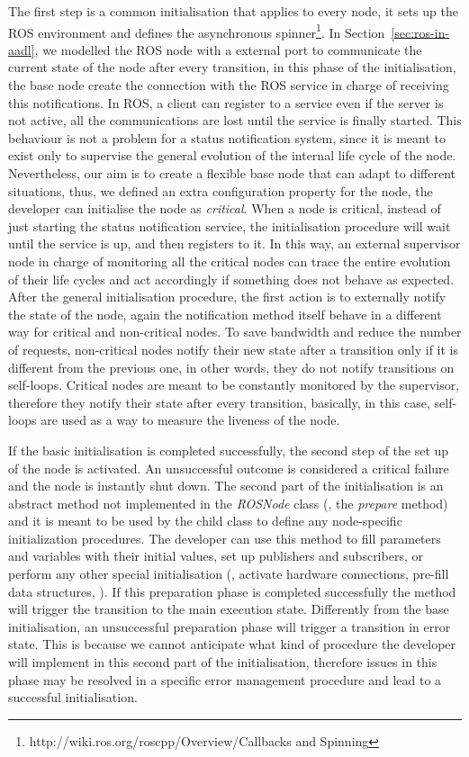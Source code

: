The first step is a common initialisation that applies to every node, it sets up the ROS environment and defines the asynchronous spinner\footnote{http://wiki.ros.org/roscpp/Overview/Callbacks and Spinning}. In Section~\ref{sec:ros-in-aadl}, we modelled the ROS node with a external port to communicate the current state of the node after every transition, in this phase of the initialisation, the base node create the connection with the ROS service in charge of receiving this notifications. In ROS, a client can register to a service even if the server is not active, all the communications are lost until the service is finally started. This behaviour is not a problem for a status notification system, since it is meant to exist only to supervise the general evolution of the internal life cycle of the node. Nevertheless, our aim is to create a flexible base node that can adapt to different situations, thus, we defined an extra configuration property for the node, the developer can initialise the node as \textit{critical}. When a node is critical, instead of just starting the status notification service, the initialisation procedure will wait until the service is up, and then registers to it. In this way, an external supervisor node in charge of monitoring all the critical nodes can trace the entire evolution of their life cycles and act accordingly if something does not behave as expected. After the general initialisation procedure, the first action is to externally notify the state of the node, again the notification method itself behave in a different way for critical and non-critical nodes. To save bandwidth and reduce the number of requests, non-critical nodes notify their new state after a transition only if it is different from the previous one, in other words, they do not notify transitions on self-loops. Critical nodes are meant to be constantly monitored by the supervisor, therefore they notify their state after every transition, basically, in this case, self-loops are used as a way to measure the liveness of the node.

If the basic initialisation is completed successfully, the second step of the set up of the node is activated. An unsuccessful outcome is considered a critical failure and the node is instantly shut down. The second part of the initialisation is an abstract method not implemented in the \textit{ROSNode} class (\ie, the \textit{prepare} method) and it is meant to be used by the child class to define any node-specific initialization procedures. The developer can use this method to fill parameters and variables with their initial values, set up publishers and subscribers, or perform any other special initialisation (\eg, activate hardware connections, pre-fill data structures, \etc). If this preparation phase is completed successfully the method will trigger the transition to the main execution state. Differently from the base initialisation, an unsuccessful preparation phase will trigger a transition in error state. This is because we cannot anticipate what kind of procedure the developer will implement in this second part of the initialisation, therefore issues in this phase may be resolved in a specific error management procedure and lead to a successful initialisation.

